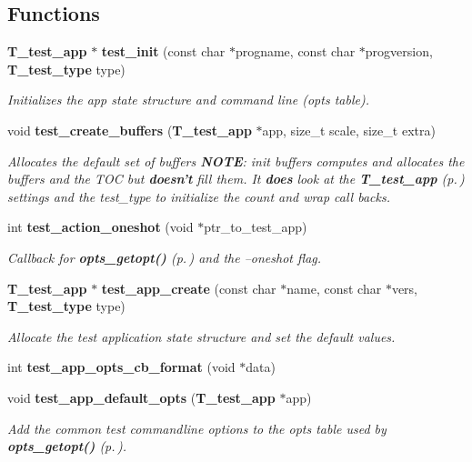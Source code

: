 \subsection*{Functions}
\begin{CompactItemize}
\item 
{\bf T\_\-test\_\-app} $\ast$ {\bf test\_\-init} (const char $\ast$progname, const char $\ast$progversion, {\bf T\_\-test\_\-type} type)
\begin{CompactList}\small\item\em Initializes the app state structure and command line (opts table).\item\end{CompactList}\item 
void {\bf test\_\-create\_\-buffers} ({\bf T\_\-test\_\-app} $\ast$app, size\_\-t scale, size\_\-t extra)
\begin{CompactList}\small\item\em Allocates the default set of buffers {\bf NOTE}: init buffers computes and allocates the buffers and the TOC but {\bf doesn't} fill them. It {\bf does} look at the {\bf T\_\-test\_\-app} {\rm (p.\,\pageref{structT__test__app})} settings and the test\_\-type to initialize the count and wrap call backs.\item\end{CompactList}\item 
int {\bf test\_\-action\_\-oneshot} (void $\ast$ptr\_\-to\_\-test\_\-app)
\begin{CompactList}\small\item\em Callback for {\bf opts\_\-getopt()} {\rm (p.\,\pageref{group__opts_a3})} and the --oneshot flag.\item\end{CompactList}\item 
{\bf T\_\-test\_\-app} $\ast$ {\bf test\_\-app\_\-create} (const char $\ast$name, const char $\ast$vers, {\bf T\_\-test\_\-type} type)
\begin{CompactList}\small\item\em Allocate the test application state structure and set the default values.\item\end{CompactList}\item 
int {\bf test\_\-app\_\-opts\_\-cb\_\-format} (void $\ast$data)
\item 
void {\bf test\_\-app\_\-default\_\-opts} ({\bf T\_\-test\_\-app} $\ast$app)
\begin{CompactList}\small\item\em Add the common test commandline options to the opts table used by {\bf opts\_\-getopt()} {\rm (p.\,\pageref{group__opts_a3})}.\item\end{CompactList}\item 

\end{CompactItemize}
